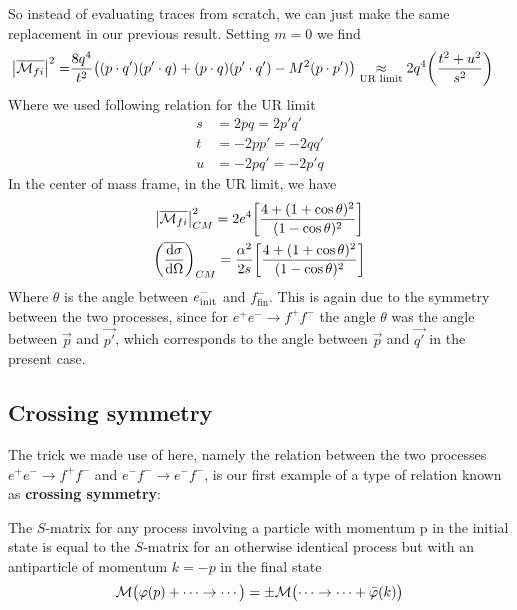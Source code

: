 \documentclass[TheoreticalPhy_ModB.tex]{subfiles}
\begin{document}
So instead of evaluating traces from scratch, we can just make the same replacement in our previous result. Setting $m = 0$ we find
\begin{align*}
\abs{\overline{\mathcal{M}_{fi}}}^2 = 	& \frac{8q^4}{t^2} \bigl( (p \cdot q')(p' \cdot q) + (p \cdot q)(p' \cdot q') - M^2 (p \cdot p') \bigr) 
	\underset{\text{UR limit}}{\approx} 2q^4 \biggl( \frac{t^2 + u^2}{s^2} \biggr)
\end{align*}
Where we used following relation for the UR limit
\[
\begin{split}
s 	& = 2pq = 2p'q' \\
t 	& = -2pp' = -2qq' \\
u 	& = -2pq' = -2p'q
\end{split}
\]
In the center of mass frame, in the UR limit, we have
\begin{gather*}
\abs{\overline{\mathcal{M}_{fi}}}^2_{CM} = 2e^4 \biggl[ \frac{4 + (1 + \cos \theta)^2}{(1 - \cos \theta)^2} \biggr] \\
\biggl( \overline{\frac{\textup{d} \sigma}{\textup{d} \Omega}} \biggr)_{CM} 
	= \frac{\alpha^2}{2s} \biggl[ \frac{4 + (1 + \cos \theta)^2}{(1 - \cos \theta)^2} \biggr]
\end{gather*}
Where $\theta$ is the angle between $e^-_{\textup{init}}$ and $f^-_{\text{fin}}$. This is again due to the symmetry between the two processes, since for $e^+e^- \to f^+f^-$ the angle $\theta$ was the angle between $\vec p$ and $\vec{p'}$, which corresponds to the angle between $\vec p$ and $\vec{q'}$ in the present case.

\begin{figure}[H]
\centering

\end{figure}

\subsection{Crossing symmetry}
The trick we made use of here, namely the relation between the two processes $e^+e^- \to f^+f^-$ and $e^-f^- \to e^-f^-$, is our first example of a type of relation known as \textbf{crossing symmetry}:
\begin{mdframed}[style=mybox]
The $S$-matrix for any process involving a particle with momentum p in the initial state is equal to the $S$-matrix for an otherwise identical process but with an antiparticle of momentum $k = -p$ in the final state
\[
\mathcal{M} \bigl( \varphi(p) + \cdots \to \cdots \bigr) = \pm \mathcal{M} \bigl( \dots \to \dots + \bar{\varphi}(k) \bigr)
\]
\end{mdframed}
\end{document}
